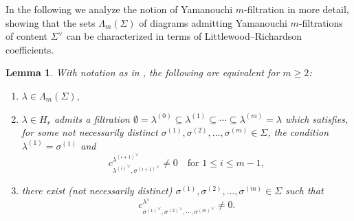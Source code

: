 \documentclass[11pt, reqno]{amsart}
\numberwithin{equation}{section}
\newtheorem{lemma}[theorem]{Lemma}
\theoremstyle{definition}
\renewcommand{\l}{\lambda}
\newcommand{\s}{\sigma}
\begin{document}
In the following we analyze the notion of Yamanouchi $m$-filtration in more detail, showing that the sets $\Lambda_m(\Sigma)$ of diagrams admitting Yamanouchi $m$-filtrations of content $\Sigma^\vee$ can be characterized in terms of Littlewood--Richardson coefficients.

\begin{lemma}\label{lemma Lambda=littlewood rich}
With notation as in ,  the following are equivalent for $m\geq 2$:
\begin{enumerate}
\item $\l\in \Lambda_m(\Sigma)$,
\item $\l\in H_r$ admits a filtration
$
\emptyset=\l^{(0)}\subseteq \lambda^{(1)}\subseteq\cdots\subseteq\lambda^{(m)}=\l
$
which satisfies, for some not necessarily distinct $\s^{(1)},\s^{(2)},\ldots,\s^{(m)}\in\Sigma$, the condition $\lambda^{(1)}=\sigma^{(1)}$ and
\[
c^{{\l^{(i+1)}}^\vee}_{{\l^{(i)}}^\vee,{\s^{(i+1)}}^\vee}\neq 0 \quad \text{for } 1\leq i\leq m-1,
\]
\item there exist   (not necessarily distinct) $\s^{(1)}, \s^{(2)}, \ldots, \s^{(m)}\in \Sigma$ such that
\[
c_{{\s^{(1)}}^\vee,{\s^{(2)}}^\vee,\cdots, {\s^{(m)}}^\vee}^{\l^\vee}\neq 0.
\]
\end{enumerate}
\end{lemma}
\end{document}
